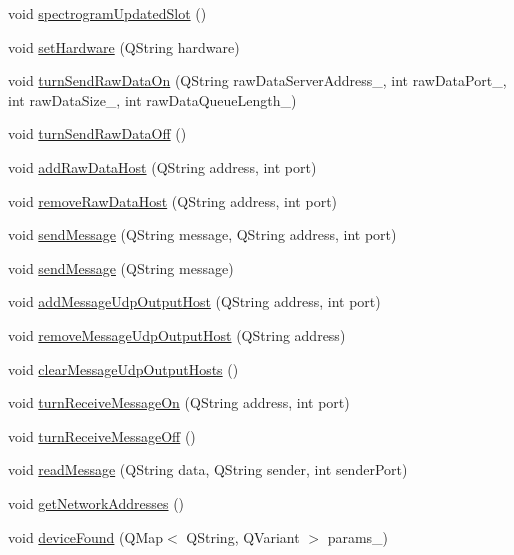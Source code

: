 \begin{DoxyCompactItemize}
void \hyperlink{classSbs2Callback_ad6b505b02b39d1c55a766d9965f6cbca}{spectrogram\-Updated\-Slot} ()
\item 
void \hyperlink{classSbs2Callback_a25ed563d5af289e5edf97a954dad0955}{set\-Hardware} (Q\-String hardware)
\item 
void \hyperlink{classSbs2Callback_a79ef4e00ba8d0ea228c588b321a6d9d1}{turn\-Send\-Raw\-Data\-On} (Q\-String raw\-Data\-Server\-Address\-\_\-, int raw\-Data\-Port\-\_\-, int raw\-Data\-Size\-\_, int raw\-Data\-Queue\-Length\-\_)
\item 
void \hyperlink{classSbs2Callback_ab8aa8c77bcfc660ead0c3bd5c9771ba7}{turn\-Send\-Raw\-Data\-Off} ()
\item 
void \hyperlink{classSbs2Callback_afed7146f24d2d0fbea4413f36689cd1e}{add\-Raw\-Data\-Host} (Q\-String address, int port)
\item 
void \hyperlink{classSbs2Callback_a63e6d9a736d558abf7d4b32527deab7b}{remove\-Raw\-Data\-Host} (Q\-String address, int port)
\item 
void \hyperlink{classSbs2Callback_a84e65bd6c98a739c5ff13afe640e2b0d}{send\-Message} (Q\-String message, Q\-String address, int port)
\item 
void \hyperlink{classSbs2Callback_a5f5c224b7876314c5a9fd57e85e84b54}{send\-Message} (Q\-String message)
\item 
void \hyperlink{classSbs2Callback_aded5f0084d59d3361d939684bd7a34e2}{add\-Message\-Udp\-Output\-Host} (Q\-String address, int port)
\item 
void \hyperlink{classSbs2Callback_afffe41163a5e4e1e7a3a2cc428946d49}{remove\-Message\-Udp\-Output\-Host} (Q\-String address)
\item 
void \hyperlink{classSbs2Callback_af6a1b32d8d4eddad9fef9c784569dc1b}{clear\-Message\-Udp\-Output\-Hosts} ()
\item 
void \hyperlink{classSbs2Callback_a233b2be700ec8c7044f2f24d73825966}{turn\-Receive\-Message\-On} (Q\-String address, int port)
\item 
void \hyperlink{classSbs2Callback_aefcdc819e629bf05240cfa3ed3eeabb5}{turn\-Receive\-Message\-Off} ()
\item 
void \hyperlink{classSbs2Callback_aa8e69a7685705f41f0e3ee288af4f899}{read\-Message} (Q\-String data, Q\-String sender, int sender\-Port)
\item 
void \hyperlink{classSbs2Callback_a6ab3cb55cc737a7797a3c310d3c51154}{get\-Network\-Addresses} ()
\item 
void \hyperlink{classSbs2Callback_a2a51dea2e8d72a184b612b8545ecd341}{device\-Found} (Q\-Map$<$ Q\-String, Q\-Variant $>$ params\-\_\-)
\end{DoxyCompactItemize}
